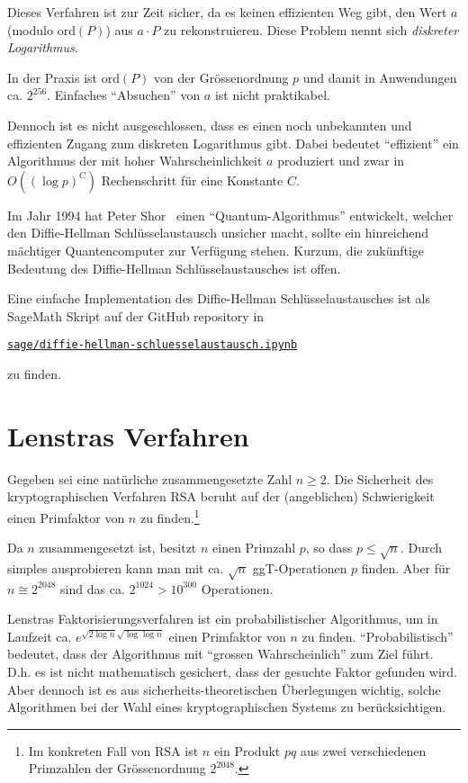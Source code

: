 Dieses Verfahren ist zur Zeit sicher, da es  keinen  effizienten Weg
gibt, den Wert $a$ (modulo $\mathrm{ord}(P)$)
aus $a\cdot P$ zu rekonstruieren. Diese Problem nennt sich
\emph{diskreter Logarithmus}.

In der Praxis ist $\mathrm{ord}(P)$ von der Grössenordnung $p$ und
damit in Anwendungen ca. $2^{256}$. Einfaches ``Absuchen'' von $a$ ist
nicht praktikabel.

Dennoch ist es nicht ausgeschlossen, dass es einen noch unbekannten
und effizienten Zugang zum diskreten Logarithmus gibt. Dabei bedeutet
``effizient'' ein Algorithmus der mit hoher Wahrscheinlichkeit $a$
produziert und zwar in $O((\log p)^C)$ Rechenschritt für eine Konstante
$C$.

Im Jahr 1994 hat Peter Shor~\cite{shor} einen ``Quantum-Algorithmus'' entwickelt,
welcher den Diffie-Hellman Schlüsselaustausch unsicher macht, sollte
ein hinreichend mächtiger Quantencomputer zur Verfügung stehen.
Kurzum, die zukünftige Bedeutung des Diffie-Hellman
Schlüsselaustausches ist offen.

Eine einfache Implementation des Diffie-Hellman Schlüsselaustausches ist als SageMath Skript
auf der GitHub repository in
\begin{center}
  \href{https://github.com/philipphabegger/ElliptischeKurvenDMK/blob/master/sage/diffie-hellman-schluesselaustausch.ipynb}{\texttt{sage/diffie-hellman-schluesselaustausch.ipynb}}
\end{center}
zu finden.

\section{Lenstras Verfahren}

Gegeben sei eine natürliche zusammengesetzte Zahl $n\ge 2$.
Die Sicherheit des kryptographischen Verfahren RSA beruht auf der (angeblichen)
Schwierigkeit einen Primfaktor von $n$ zu finden.\footnote{Im
  konkreten Fall von RSA ist $n$ ein Produkt $pq$ aus zwei
  verschiedenen Primzahlen
  der Grössenordnung $2^{2048}$.}


Da $n$ zusammengesetzt ist, besitzt $n$ einen Primzahl $p$, so dass
$p\le \sqrt{n}$. Durch simples ausprobieren kann man mit ca. $\sqrt n$
ggT-Operationen $p$ finden. Aber für $n\cong 2^{2048}$ sind das ca.
$2^{1024}> 10^{300}$ Operationen. 

Lenstras Faktorisierungsverfahren ist ein probabilistischer
Algorithmus, um in Laufzeit ca. $e^{\sqrt{2\log n}\sqrt{\log\log n}}$
einen Primfaktor von $n$ zu finden. ``Probabilistisch'' bedeutet, dass
der Algorithmus mit ``grossen Wahrscheinlich'' zum Ziel führt. D.h. es
ist nicht mathematisch gesichert, dass der gesuchte Faktor gefunden
wird. Aber dennoch ist es aus sicherheits-theoretischen Überlegungen
wichtig, solche Algorithmen bei der Wahl eines kryptographischen
Systems zu berücksichtigen.


